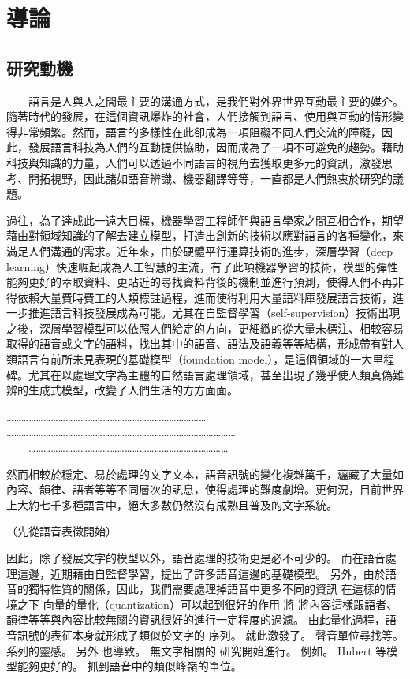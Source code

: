 \chapter{導論}
\section{研究動機}  %

　　語言是人與人之間最主要的溝通方式，是我們對外界世界互動最主要的媒介。隨著時代的發展，在這個資訊爆炸的社會，人們接觸到語言、使用與互動的情形變得非常頻繁。然而，語言的多樣性在此卻成為一項阻礙不同人們交流的障礙，因此，發展語言科技為人們的互動提供協助，因而成為了一項不可避免的趨勢。藉助科技與知識的力量，人們可以透過不同語言的視角去獲取更多元的資訊，激發思考、開拓視野，因此諸如語音辨識、機器翻譯等等，一直都是人們熱衷於研究的議題。

    過往，為了達成此一遠大目標，機器學習工程師們與語言學家之間互相合作，期望藉由對領域知識的了解去建立模型，打造出創新的技術以應對語言的各種變化，來滿足人們溝通的需求。近年來，由於硬體平行運算技術的進步，深層學習（deep learning）快速崛起成為人工智慧的主流，有了此項機器學習的技術，模型的彈性能夠更好的萃取資料、更貼近的尋找資料背後的機制並進行預測，使得人們不再非得依賴大量費時費工的人類標註過程，進而使得利用大量語料庫發展語言技術，進一步推進語言科技發展成為可能。尤其在自監督學習（self-supervision）技術出現之後，深層學習模型可以依照人們給定的方向，更細緻的從大量未標注、相較容易取得的語音或文字的語料，找出其中的語音、語法及語義等等結構，形成帶有對人類語言有前所未見表現的基礎模型（foundation model），是這個領域的一大里程碑。尤其在以處理文字為主體的自然語言處理領域，甚至出現了幾乎使人類真偽難辨的生成式模型，改變了人們生活的方方面面。

    ……………………………………………………………………… \\
    ………………………………………………………………………………… \\
　　………………………………………………………………………

    然而相較於穩定、易於處理的文字文本，語音訊號的變化複雜萬千，蘊藏了大量如內容、韻律、語者等等不同層次的訊息，使得處理的難度劇增。更何況，目前世界上大約七千多種語言中，絕大多數仍然沒有成熟且普及的文字系統。

    （先從語音表徵開始）

    因此，除了發展文字的模型以外，語音處理的技術更是必不可少的。
而在語音處理這邊，近期藉由自監督學習，提出了許多語音這邊的基礎模型。
另外，由於語音的獨特性質的關係，因此，我們需要處理掉語音中更多不同的資訊 在這樣的情境之下 向量的量化（quantization）可以起到很好的作用 將 將內容這樣跟語者、韻律等等與內容比較無關的資訊很好的進行一定程度的過濾。 由此量化過程，語音訊號的表征本身就形成了類似於文字的 序列。 就此激發了。 聲音單位尋找等。 系列的靈感。 另外 也導致。 無文字相關的 研究開始進行。 例如。 Hubert 等模型能夠更好的。 抓到語音中的類似峰嶺的單位。 

